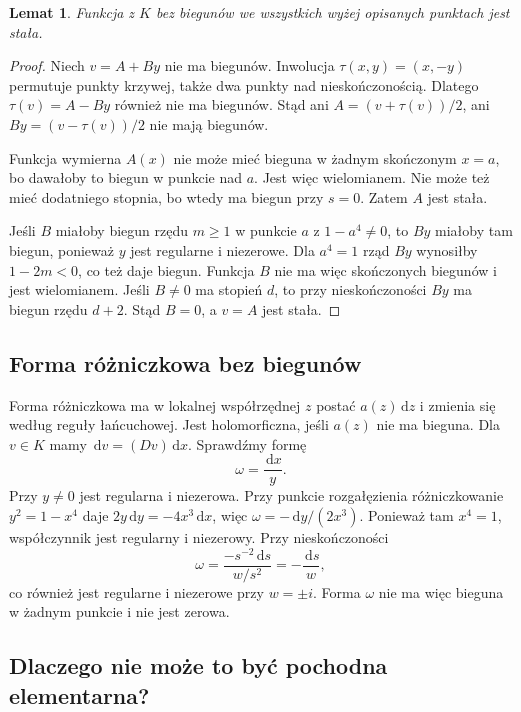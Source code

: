 \documentclass[11pt,a4paper,oneside]{book}
\numberwithin{equation}{section}
\theoremstyle{plain}
\newtheorem{lemat}[twierdzenie]{Lemat}
\theoremstyle{definition}
\theoremstyle{remark}
\newcommand{\dd}{\,\mathrm{d}}
\begin{document}
\begin{lemat}
Funkcja z $K$ bez biegunów we wszystkich wyżej opisanych punktach jest stała.
\end{lemat}
\begin{proof}
Niech $v=A+By$ nie ma biegunów. Inwolucja $\tau(x,y)=(x,-y)$ permutuje punkty krzywej, także dwa punkty nad nieskończonością. Dlatego $\tau(v)=A-By$ również nie ma biegunów. Stąd ani $A=(v+\tau(v))/2$, ani $By=(v-\tau(v))/2$ nie mają biegunów.

Funkcja wymierna $A(x)$ nie może mieć bieguna w żadnym skończonym $x=a$, bo dawałoby to biegun w punkcie nad $a$. Jest więc wielomianem. Nie może też mieć dodatniego stopnia, bo wtedy ma biegun przy $s=0$. Zatem $A$ jest stała.

Jeśli $B$ miałoby biegun rzędu $m\ge1$ w punkcie $a$ z $1-a^4\ne0$, to $By$ miałoby tam biegun, ponieważ $y$ jest regularne i niezerowe. Dla $a^4=1$ rząd $By$ wynosiłby $1-2m<0$, co też daje biegun. Funkcja $B$ nie ma więc skończonych biegunów i jest wielomianem. Jeśli $B\ne0$ ma stopień $d$, to przy nieskończoności $By$ ma biegun rzędu $d+2$. Stąd $B=0$, a $v=A$ jest stała.
\end{proof}

\subsection{Forma różniczkowa bez biegunów}

Forma różniczkowa ma w lokalnej współrzędnej $z$ postać $a(z)\dd z$ i zmienia się według reguły łańcuchowej. Jest holomorficzna, jeśli $a(z)$ nie ma bieguna. Dla $v\in K$ mamy $\dd v=(Dv)\dd x$. Sprawdźmy formę
\[
\omega=\frac{\dd x}{y}.
\]
Przy $y\ne0$ jest regularna i niezerowa. Przy punkcie rozgałęzienia różniczkowanie $y^2=1-x^4$ daje $2y\dd y=-4x^3\dd x$, więc $\omega=-\dd y/(2x^3)$. Ponieważ tam $x^4=1$, współczynnik jest regularny i niezerowy. Przy nieskończoności
\[
\omega=\frac{-s^{-2}\dd s}{w/s^2}=-\frac{\dd s}{w},
\]
co również jest regularne i niezerowe przy $w=\pm i$. Forma $\omega$ nie ma więc bieguna w żadnym punkcie i nie jest zerowa.

\subsection{Dlaczego nie może to być pochodna elementarna?}
\end{document}
